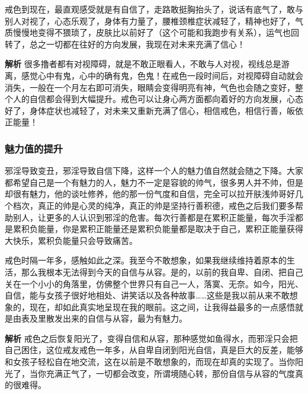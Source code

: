 \begin{case}
    戒色到现在，最直观感受就是有自信了，走路敢挺胸抬头了，说话有底气了，敢与别人对视了，心态乐观了，身体有力量了，腰椎颈椎症状减轻了，精神也好了，气质慢慢地变得不猥琐了，皮肤比以前好了（这个可能和我跑步有关系），运气也回转了，总之一切都在往好的方向发展，我现在对未来充满了信心！

    \textbf{解析} 很多撸者都有对视障碍，就是不敢正眼看人，不敢与人对视，视线总是游离，感觉心中有鬼，心中的确有鬼，色鬼！在戒色一段时间后，对视障碍自动就会消失，一般在一个月左右即可消失，眼睛会变得明亮有神，气色也会随之变好，整个人的自信都会得到大幅提升。戒色可以让身心两方面都向着好的方向发展，心态好了，身体症状也减轻了，对未来又重新充满了信心，相信戒色，相信行善，皈依正能量！
\end{case}

\subsubsection{魅力值的提升}

邪淫导致变丑，邪淫导致自信下降，这样一个人的魅力值自然就会随之下降。大家都希望自己是一个有魅力的人，魅力不一定是容貌的帅气，很多男人并不帅，但是却很有魅力，他的谈吐修养，他的那一份气度和自信，完全可以拉开肤浅帅哥好几个档次，真正的帅是心灵的纯净，真正的帅是坚持行善积德，戒色之后我们要多帮助别人，让更多的人认识到邪淫的危害。每次行善都是在累积正能量，每次手淫都是累积负能量，你是累积正能量还是累积负能量都是取决于自己，累积正能量获得大快乐，累积负能量只会导致痛苦。

\begin{case}
    戒色时隔一年多，感触如此之深。我至今不敢想象，如果我继续维持着原本的生活，那么我根本无法得到今天的自信与从容。是的，以前的我自卑、自闭、把自己关在一个小小的角落里，仿佛整个世界只有自己一人，落寞、无奈。如今，阳光、自信，能与女孩子很好地相处、讲笑话以及各种故事……这些是我以前从来不敢想象的，现在，却如此真实地呈现在我的眼前。这之间，让我得益最多的一点感悟就是由表及里散发出来的自信与从容，最为有魅力。

    \textbf{解析} 戒色之后恢复阳光了，变得自信和从容，那种感觉如鱼得水，而邪淫只会把自己困住，这位戒友戒色一年多，从自卑自闭到阳光自信，真是巨大的反差，能够和女孩子轻松自在地交流，这在以前是不敢想象的，而现在却真的实现了。当你阳光了，当你充满正气了，一切都会改变，所谓境随心转，那份自信与从容的气度真的很难得。
\end{case}

